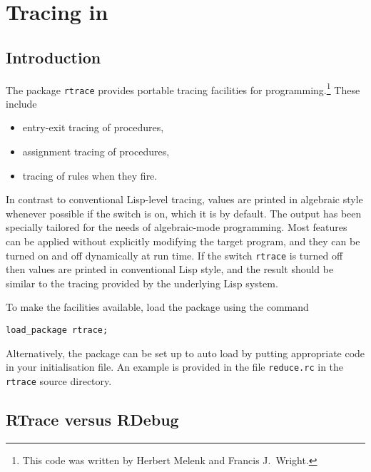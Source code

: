 \chapter{Tracing in \REDUCE}

\newcommand{\rdebug}{\texttt{rdebug}}
\newcommand{\rtrace}{\texttt{rtrace}}


\section{Introduction}

The package \rtrace{} provides portable tracing facilities for
\REDUCE{} programming.\footnote{This code was written by Herbert Melenk and Francis J.~Wright.}
These include
\begin{itemize}
\item entry-exit tracing of procedures,
\item assignment tracing of procedures,
\item tracing of rules when they fire.
\end{itemize}
In contrast to conventional Lisp-level tracing, values are printed in
algebraic style whenever possible if the switch
 is on, which
it is by default.  The output has been specially tailored for the
needs of algebraic-mode programming.  Most features can be applied
without explicitly modifying the target program, and they can be
turned on and off dynamically at run time.  If the switch \rtrace{} is
turned off then values are printed in conventional Lisp style, and the
result should be similar to the tracing provided by the underlying
Lisp system.

To make the facilities available, load the package using the command
\begin{verbatim}
load_package rtrace;
\end{verbatim}
Alternatively, the package can be set up to auto load by putting
appropriate code in your \REDUCE{} initialisation file.  An example is
provided in the file \texttt{reduce.rc} in the \rtrace{} source
directory.

\section{RTrace versus RDebug}

